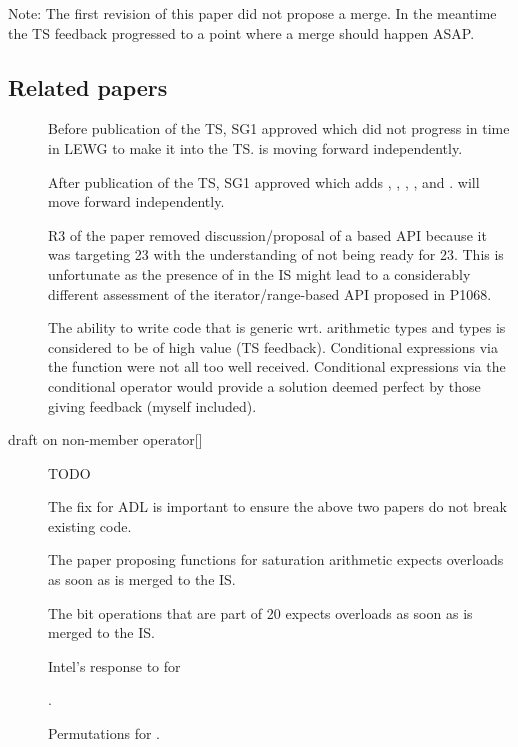 Note: The first revision of this paper did not propose a merge.
In the meantime the TS feedback progressed to a point where a merge should happen ASAP.

\subsection{Related papers}
\begin{description}
  \item[] Before publication of the TS, SG1 approved \cite{P0350R0} which did not progress in time in LEWG to make it into the TS.
     is moving forward independently.

  \item[] After publication of the TS, SG1 approved \cite{P0918R2} which adds , , , , and .
     will move forward independently.

  \item[] R3 of the paper removed discussion/proposal of a  based API because it was targeting \CC{}23 with the understanding of  not being ready for \CC{}23.
    This is unfortunate as the presence of  in the IS might lead to a considerably different assessment of the iterator/range-based API proposed in P1068.

  \item[] The ability to write code that is generic wrt. arithmetic types and  types is considered to be of high value (TS feedback).
    Conditional expressions via the  function were not all too well received.
    Conditional expressions via the conditional operator would provide a solution deemed perfect by those giving feedback (myself included).

  \item[draft on non-member {operator[]}] TODO

  \item[] The fix for ADL is important to ensure the above two papers do not break existing code.

  \item[] The paper proposing functions for saturation arithmetic expects  overloads as soon as  is merged to the IS.

  \item[] The bit operations that are part of \CC{}20 expects  overloads as soon as  is merged to the IS.

  \item[] Intel’s response to  for 

  \item[] .

  \item[] Permutations for .

\end{description}
